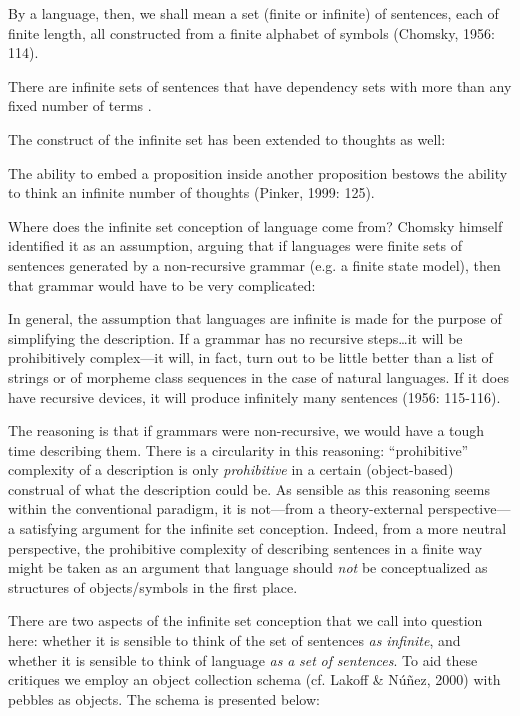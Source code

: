 By a language, then, we shall mean a set (finite or infinite) of sentences, each of finite length, all constructed from a finite alphabet of symbols (Chomsky, 1956: 114).

There are infinite sets of sentences that have dependency sets with more than any fixed number of terms \citep[115]{Chomsky1956}. 

The construct of the infinite set has been extended to thoughts as well:

The ability to embed a proposition inside another proposition bestows the ability to think an infinite number of thoughts (Pinker, 1999: 125). 

  Where does the infinite set conception of language come from? Chomsky himself identified it as an assumption, arguing that if languages were finite sets of sentences generated by a non-recursive grammar (e.g. a finite state model), then that grammar would have to be very complicated:

In general, the assumption that languages are infinite is made for the purpose of simplifying the description. If a grammar has no recursive steps…it will be prohibitively complex—it will, in fact, turn out to be little better than a list of strings or of morpheme class sequences in the case of natural languages. If it does have recursive devices, it will produce infinitely many sentences (1956: 115-116).

  The reasoning is that if grammars were non-recursive, we would have a tough time describing them. There is a circularity in this reasoning: “prohibitive” complexity of a description is only \textit{prohibitive} in a certain (object-based) construal of what the description could be. As sensible as this reasoning seems within the conventional paradigm, it is not—from a theory-external perspective—a satisfying argument for the infinite set conception. Indeed, from a more neutral perspective, the prohibitive complexity of describing sentences in a finite way might be taken as an argument that language should \textit{not} be conceptualized as structures of objects/symbols in the first place.

  There are two aspects of the infinite set conception that we call into question here:  whether it is sensible to think of the set of sentences \textit{as} \textit{infinite}, and  whether it is sensible to think of language \textit{as} \textit{a} \textit{set} \textit{of} \textit{sentences}. To aid these critiques we employ an object collection schema (cf. Lakoff \& Núñez, 2000) with pebbles as objects. The schema is presented below: 

